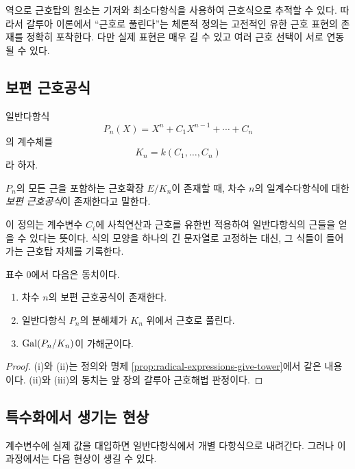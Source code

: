 \begin{remark}
역으로 근호탑의 원소는 기저와 최소다항식을 사용하여 근호식으로 추적할 수 있다. 따라서 갈루아 이론에서 ``근호로 풀린다''는 체론적 정의는 고전적인 유한 근호 표현의 존재를 정확히 포착한다. 다만 실제 표현은 매우 길 수 있고 여러 근호 선택이 서로 연동될 수 있다.
\end{remark}

\subsection{보편 근호공식}

일반다항식
\[
  P_n(X)=X^n+C_1X^{n-1}+\cdots+C_n
\]
의 계수체를
\[
  K_n=k(C_1,\dots,C_n)
\]
라 하자.

\begin{definition}[보편 근호공식]
\label{def:universal-radical-formula}
$P_n$의 모든 근을 포함하는 근호확장 $E/K_n$이 존재할 때, 차수 $n$의 일계수다항식에 대한 \emph{보편 근호공식}이 존재한다고 말한다.
\end{definition}

이 정의는 계수변수 $C_i$에 사칙연산과 근호를 유한번 적용하여 일반다항식의 근들을 얻을 수 있다는 뜻이다. 식의 모양을 하나의 긴 문자열로 고정하는 대신, 그 식들이 들어가는 근호탑 자체를 기록한다.

\begin{theorem}
\label{thm:universal-formula-equivalent-generic-solvable}
표수 $0$에서 다음은 동치이다.
\begin{enumerate}[label=(\roman*)]
  \item 차수 $n$의 보편 근호공식이 존재한다.
  \item 일반다항식 $P_n$의 분해체가 $K_n$ 위에서 근호로 풀린다.
  \item $\operatorname{Gal}(P_n/K_n)$이 가해군이다.
\end{enumerate}
\end{theorem}

\begin{proof}
(i)와 (ii)는 정의와 명제 \ref{prop:radical-expressions-give-tower}에서 같은 내용이다. (ii)와 (iii)의 동치는 앞 장의 갈루아 근호해법 판정이다.
\end{proof}

\subsection{특수화에서 생기는 현상}

계수변수에 실제 값을 대입하면 일반다항식에서 개별 다항식으로 내려간다. 그러나 이 과정에서는 다음 현상이 생길 수 있다.

